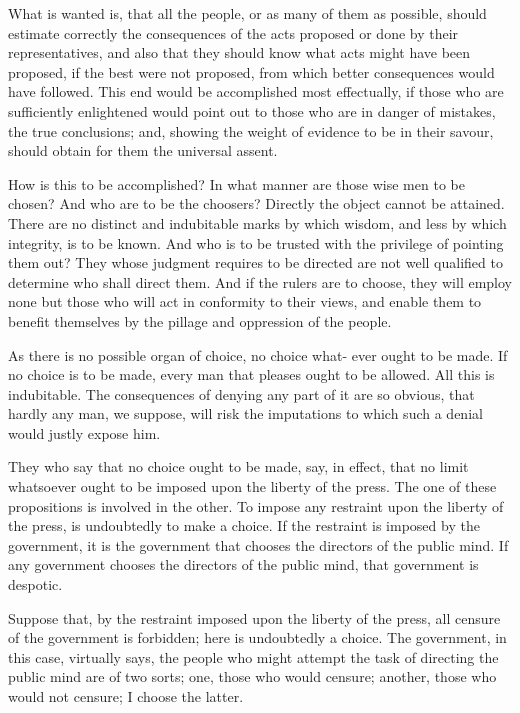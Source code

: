 \documentclass{article}
\begin{document}
What is wanted is, that all the people, or as many of them as possible, should estimate correctly the consequences of the acts proposed or done by their representatives, and also that they should know what acts might have been proposed, if the best were not proposed, from which better consequences would have followed. This end would be accomplished most effectually, if those who are sufficiently enlightened would point out to those who are in danger of mistakes, the true conclusions; and, showing the weight of evidence to be in their savour, should obtain for them the universal assent.

How is this to be accomplished? In what manner are those wise men to be chosen? And who are to be the choosers? Directly the object cannot be attained. There are no distinct and indubitable marks by which wisdom, and less by which integrity, is to be known. And who is to be trusted with the privilege of pointing them out? They whose judgment requires to be directed are not well qualified to determine who shall direct them. And if the rulers are to choose, they will employ none but those who will act in conformity to their views, and enable them to benefit themselves by the pillage and oppression of the people.

As there is no possible organ of choice, no choice what- ever ought to be made. If no choice is to be made, every man that pleases ought to be allowed. All this is indubitable. The consequences of denying any part of it are so obvious, that hardly any man, we suppose, will risk the imputations to which such a denial would justly expose him.

They who say that no choice ought to be made, say, in effect, that no limit whatsoever ought to be imposed upon the liberty of the press. The one of these propositions is involved in the other. To impose any restraint upon the liberty of the press, is undoubtedly to make a choice. If the restraint is imposed by the government, it is the government that chooses the directors of the public mind. If any government chooses the directors of the public mind, that government is despotic.

Suppose that, by the restraint imposed upon the liberty of the press, all censure of the government is forbidden; here is undoubtedly a choice. The government, in this case, virtually says, the people who might attempt the task of directing the public mind are of two sorts; one, those who would censure; another, those who would not censure; I choose the latter.
\end{document}
